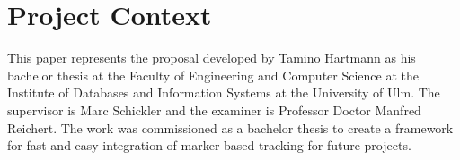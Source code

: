 \section{Project Context}

This paper represents the proposal developed by Tamino Hartmann as his bachelor thesis at the Faculty of Engineering and Computer Science\cite{faculty} at the Institute of Databases and Information Systems at the University of Ulm\cite{ulmuni}.
The supervisor is Marc Schickler and the examiner is Professor Doctor Manfred Reichert.
The work was commissioned as a bachelor thesis to create a framework for fast and easy integration of marker-based tracking for future projects.
